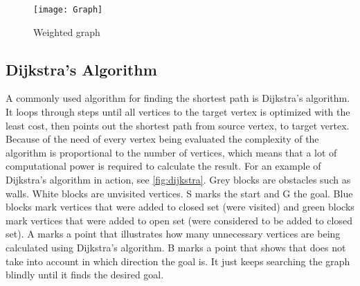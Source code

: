 



  \begin{figure}[ht!]
    \centering
    \texttt{[image: Graph]}
    \caption{Weighted graph}
    \label{fig:graph}
  \end{figure}


  \subsection{Dijkstra's Algorithm}\label{subs_dijkstra}


  A commonly used algorithm for finding the shortest path is Dijkstra's algorithm. It loops through steps until all vertices to the target vertex is optimized with the least cost, then points out the shortest path from source vertex, to target vertex. Because of the need of every vertex being evaluated the complexity of the algorithm is proportional to the number of vertices, which means that a lot of computational power is required to calculate the result. \cite{Dijkstr1959} For an example of Dijkstra's algorithm in action, see \cref{fig:dijkstra}. Grey blocks are obstacles such as walls. White blocks are unvisited vertices. S marks the start and G the goal. Blue blocks mark vertices that were added to closed set (were visited) and green blocks mark vertices that were added to open set (were considered to be added to closed set).  A marks a point that illustrates how many unnecessary vertices are being calculated using Dijkstra's algorithm. B marks a point that shows that does not take into account in which direction the goal is. It just keeps searching the graph blindly until it finds the desired goal.


